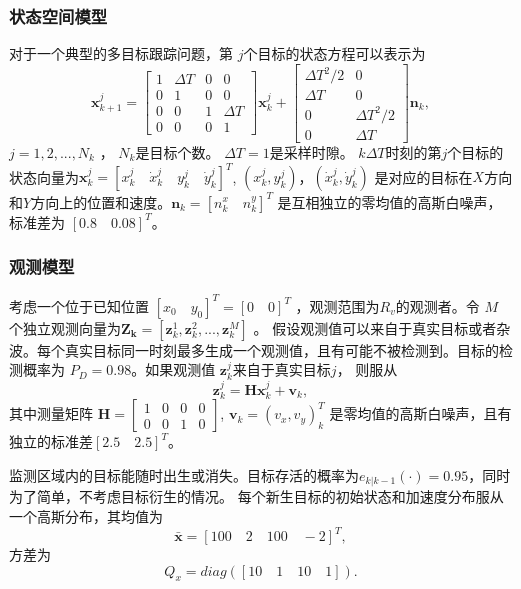 \subsubsection{状态空间模型}
对于一个典型的多目标跟踪问题，第 $j$个目标的状态方程可以表示为
\begin{equation}\label{Eq:215}
\mathbf{x}^j_{k+1}=
\left[
\begin{array}{cccc}
1 & \Delta T & 0 & 0\\
0 & 1 & 0 & 0\\
0 & 0 & 1 & \Delta T\\
0 & 0 & 0 & 1
\end{array}
\right]\mathbf{x}^j_k+\left[
\begin{array}{cccc}
{\Delta T^2}/{2} &  0    \\
\Delta T  &   0  \\
0 & {\Delta T^2}/{2} \\
0   &  \Delta T
\end{array}
\right]\mathbf{n}_k,
\end{equation}
$j=1,2,...,N_k$ ，
$N_k$是目标个数。
$\Delta T=1$是采样时隙。
$k\Delta T$时刻的第$j$个目标的状态向量为$\mathbf{x}^j_k=\left[x^j_k \quad \dot{x}^j_k \quad y^j_k \quad \dot{y}^j_k \right]^T$, $(x^j_k, y^j_k)$，$(\dot{x}^j_k, \dot{y}^j_k)$ 是对应的目标在$X$方向和$Y$方向上的位置和速度。$\mathbf{n}_k=[n^x_k \quad n^y_k]^T$ 是互相独立的零均值的高斯白噪声，标准差为 $[0.8\quad0.08]^T$。

\subsubsection{观测模型}
考虑一个位于已知位置 $[x_0\quad y_0]^T=[0\quad 0]^T$ ，观测范围为$R_v$的观测者。令 $M$ 个独立观测向量为$\mathbf{Z_k}=[\mathbf{z}^1_k,\mathbf{z}^2_k,...,\mathbf{z}^M_k]$ 。
假设观测值可以来自于真实目标或者杂波。每个真实目标同一时刻最多生成一个观测值，且有可能不被检测到。目标的检测概率为 $P_D=0.98$。如果观测值 $\mathbf{z}^j_k$来自于真实目标$j$， 则服从
\begin{equation}\label{Eq:22}
\mathbf{z}^j_k=\mathbf{H}\mathbf{x}^j_k+\mathbf{v}_k,
\end{equation}
其中测量矩阵 $\mathbf{H}=\left[
\begin{array}{cccccc}
1 & 0 & 0 & 0\\
0 & 0 & 1 & 0
\end{array}
\right]$,  $\mathbf{v}_k=(v_x,v_y)^T_k$ 是零均值的高斯白噪声，且有独立的标准差$[2.5\quad 2.5]^T$。

监测区域内的目标能随时出生或消失。目标存活的概率为$e_{k|k-1}(\cdot)=0.95$，同时为了简单，不考虑目标衍生的情况。
每个新生目标的初始状态和加速度分布服从一个高斯分布，其均值为
\begin{equation}\label{Eq:23}
	\mathbf{\bar{x}}=[100 \quad 2 \quad 100 \quad -2]^T,
\end{equation}
方差为
\begin{equation}\label{Eq:24}
	Q_x=diag([10 \quad 1 \quad 10 \quad 1]).
\end{equation}

